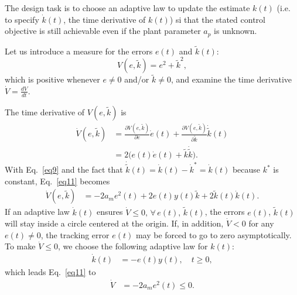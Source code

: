 \documentclass[12pt,a4paper,oneside]{book}
\begin{document}
\begin{onehalfspace}
\begin{example}
	The design task is to choose an adaptive law to update the estimate $k(t)$ (i.e. to specify $\dot{k}(t)$, the time derivative of $k(t)$) si that the stated control objective is still achievable even if the plant parameter $a_p$ is unknown. 
	
	Let us introduce a measure for the errors $e(t)$ and $\tilde{k}(t)$: 
	\begin{equation}\label{eq10}
		V(e,\tilde{k})=e^2+\tilde{k}^2,
	\end{equation} 
	which is positive whenever $e\ne0$ and/or $\tilde{k}\ne0$, and examine the time derivative $\dot{V}=\frac{dV}{dt}$.
	
	The time derivative of  $V(e,\tilde{k})$ is
	\begin{equation}\label{eq11}
		\begin{aligned}
			\dot{V}(e,\tilde{k}) &= \frac{\partial {V}(e,\tilde{k})}{\partial e}\dot{e}(t)+\frac{\partial {V}(e,\tilde{k})}{\partial \tilde{k}}\dot{\tilde{k}}(t) \\[6pt]
			&= 2\Big(e(t)\dot{e}(t)+\tilde{k}\dot{\tilde{k}}\Big).
		\end{aligned}
	\end{equation} 
	With Eq.~\ref{eq9} and the fact that $\dot{\tilde{k}}(t)=\dot{k}(t)-\dot{k}^*=\dot{k}(t)$ because $k^*$ is constant, Eq.~\ref{eq11} becomes
	\begin{equation}\label{eq12}
		\begin{aligned}
			\dot{V}(e,\tilde{k}) &= -2a_me^2(t)+2e(t)y(t)\tilde{k}+2\tilde{k}(t)\dot{k}(t).
		\end{aligned}
	\end{equation} 
	If an adaptive law $\dot{k}(t)$ ensures $\dot{V}\le0,\,\forall\,e(t),\,\tilde{k}(t)$, the errors $e(t)$, $\tilde{k}(t)$ will stay inside a circle centered at the origin. If, in addition, $\dot{V}<0$ for any $e(t)\ne0$, the tracking error $e(t)$ may be forced to go to zero asymptotically. To make $\dot{V}\le0$, we choose the following adaptive law for $k(t)$:
	\begin{equation}\label{eq13}
		\begin{aligned}
			\dot{k}(t) &= -e(t)y(t),\quad t\ge0,
		\end{aligned}
	\end{equation} 
	which leads Eq.~\ref{eq11} to 
	\begin{equation}\label{eq14}
		\begin{aligned}
			\dot{V} &= -2a_me^2(t)\le0.
		\end{aligned}
	\end{equation} 

\end{example}
\end{onehalfspace}
\end{document}
